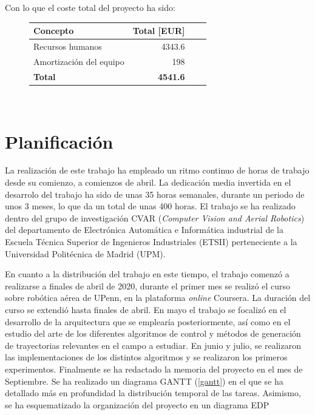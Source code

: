 Con lo que el coste total del proyecto ha sido:

\begin{figure}[htb!]
	\centering
	\begin{tabular}{|l|r|r|r|}
		\hline
		\textbf{Concepto} &Total [EUR]\\
		\hline
		Recursos humanos & 4343.6\\
		Amortización del equipo & 198\\
		
		\hline
		\textbf{Total}   & \textbf{4541.6}\\
		\hline
	\end{tabular}\\
\end{figure}




\newpage
\section{Planificación}
La realización de este trabajo ha empleado un ritmo continuo de horas de trabajo desde su comienzo, a comienzos de abril. La dedicación media invertida en el desarrolo del trabajo ha sido de unas 35 horas semanales, durante un periodo de unos 3 meses, lo que da un total de unas 400 horas. El trabajo se ha realizado dentro del grupo de investigación CVAR (\textit{Computer Vision and Aerial Robotics}) del departamento de Electrónica Automática e Informática industrial de la Escuela Técnica Superior de Ingenieros Industriales (ETSII) perteneciente a la Universidad Politécnica de Madrid (UPM).

En cuanto a la distribución del trabajo en este tiempo, el trabajo comenzó a realizarse a finales de abril de 2020, durante el primer mes se realizó el curso sobre robótica aérea de UPenn, en la plataforma \textit{online} Coursera. La duración del curso se extendió hasta finales de abril. En mayo el trabajo se focalizó en el desarrollo de la arquitectura que se emplearía posteriormente, así como en el estudio del arte de los diferentes algoritmos de control y métodos de generación de trayectorias relevantes en el campo a estudiar. En junio y julio, se realizaron las implementaciones de los distintos algoritmos y se realizaron los primeros experimentos. Finalmente se ha redactado la memoria del proyecto en el mes de Septiembre. Se ha realizado un diagrama GANTT (\cref{gantt}) en el que se ha detallado más en profundidad la distribución temporal de las tareas. Asimismo, se ha esquematizado la organización del proyecto en un diagrama EDP 

